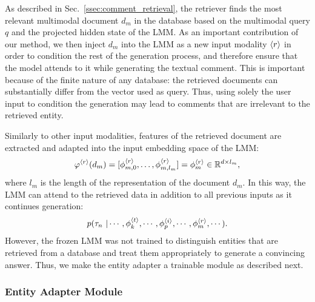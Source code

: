 As described in Sec.~\ref{ssec:comment_retrieval}, the retriever finds the most relevant multimodal document $d_m$ in the database based on the multimodal query $q$ and the projected hidden state of the LMM.
%
As an important contribution of our method, we then inject $d_m$ into the LMM as a new input modality ${\langle r\rangle}$ in order to condition the rest of the generation process, and therefore ensure that the model attends to it while generating the textual comment.
This is important because of the finite nature of any database: the retrieved documents can substantially differ from the vector used as query.
Thus, using solely the user input to condition the generation may lead to comments that are irrelevant to the retrieved entity.
%

Similarly to other input modalities, features of the retrieved document are extracted and adapted into the input embedding space of the LMM:
\begin{equation}
  \varphi^{{\langle r\rangle}}(d_m) = [\phi^{{\langle r\rangle}}_{m,0}, \ldots, \phi^{{\langle r\rangle}}_{m,l_m}] = \phi^{{\langle r\rangle}}_m \in \mathbb{R}^{d\times l_m},
\end{equation}
where $l_m$ is the length of the representation of the document $d_m$.
In this way, the LMM can attend to the retrieved data in addition to all previous inputs as it continues generation:
\begin{equation}
    p(\tau_{n} ~ | \cdots, \phi^{{\langle t\rangle}}_k, \cdots, \phi^{{\langle i\rangle}}_p, \cdots, \phi^{{\langle r\rangle}}_m, \cdots).
    \label{eq:llm_embd2}
\end{equation}
However, the frozen LMM was not trained to distinguish entities that are retrieved from a database and treat them appropriately to generate a convincing answer.
Thus, we make the entity adapter a trainable module as described next. 

%

\subsubsection{Entity Adapter Module}

